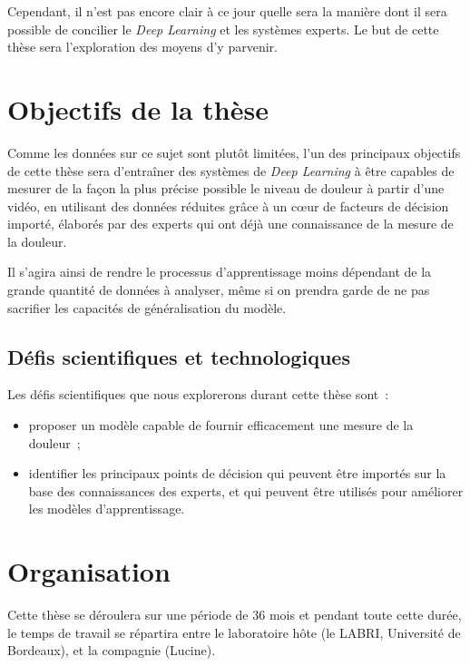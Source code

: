 \documentclass[11pt]{article}
\begin{document}
Cependant, il n’est pas encore clair à ce jour quelle sera la manière dont il
sera possible de concilier le \emph{Deep Learning} et les systèmes experts. Le but de
cette thèse sera l’exploration des moyens d’y parvenir. 

\section{Objectifs de la thèse}
\label{sec:orgf1f9281}

\vincentrmk{}

Comme les données sur ce sujet sont plutôt limitées, l’un des principaux
objectifs de cette thèse sera d’entraîner des systèmes de \emph{Deep Learning} à être
capables de mesurer de la façon la plus précise possible le niveau de douleur
à partir d'une vidéo, en utilisant des données réduites grâce à un c\oe{}ur de facteurs de
décision importé, élaborés par des experts qui ont déjà une connaissance de la
mesure de la douleur.  

Il s’agira ainsi de rendre le processus d’apprentissage moins dépendant de la
grande quantité de données à analyser, même si on prendra garde de ne pas
sacrifier les capacités de généralisation du modèle.  


\subsection{Défis scientifiques et technologiques}
\label{sec:org70ad40f}

Les défis scientifiques que nous explorerons durant cette thèse sont~:
\begin{itemize}
\item proposer un modèle capable de fournir efficacement une mesure de
  la douleur~;
\item identifier les principaux points de décision qui peuvent être importés sur
la base des connaissances des experts, et qui peuvent être utilisés pour
améliorer les modèles d’apprentissage.
\end{itemize}


\section{Organisation}
\label{sec:org1cc9eab}
Cette thèse se déroulera sur une période de 36 mois et pendant toute cette
durée, le temps de travail se répartira entre le laboratoire hôte (le LABRI,
Université de Bordeaux), et la compagnie (Lucine).
\end{document}
